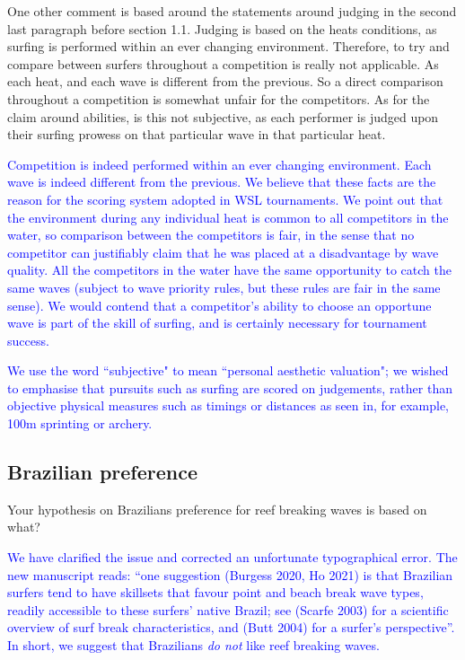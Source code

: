 \documentclass[12pt]{article}
\begin{document}
One other comment is based around the statements around judging in the
second last paragraph before section 1.1. Judging is based on the
heats conditions, as surfing is performed within an ever changing
environment. Therefore, to try and compare between surfers throughout
a competition is really not applicable. As each heat, and each wave is
different from the previous. So a direct comparison throughout a
competition is somewhat unfair for the competitors. As for the claim
around abilities, is this not subjective, as each performer is judged
upon their surfing prowess on that particular wave in that particular
heat.


\textcolor{blue}{Competition is indeed performed within an ever
  changing environment.  Each wave is indeed different from the
  previous.  We believe that these facts are the reason for the
  scoring system adopted in WSL tournaments.  We point out that the
  environment during any individual heat is common to all competitors
  in the water, so comparison between the competitors is fair, in the
  sense that no competitor can justifiably claim that he was placed at
  a disadvantage by wave quality.  All the competitors in the water
  have the same opportunity to catch the same waves (subject to wave
  priority rules, but these rules are fair in the same sense).  We
  would contend that a competitor's ability to choose an opportune
  wave is part of the skill of surfing, and is certainly necessary for
  tournament success.}

\textcolor{blue}{We use the word ``subjective" to mean ``personal
  aesthetic valuation"; we wished to emphasise that pursuits such as
  surfing are scored on judgements, rather than objective physical
  measures such as timings or distances as seen in, for example, 100m
  sprinting or archery.}
  
\subsection*{Brazilian preference}


Your hypothesis on Brazilians preference for reef breaking waves is
based on what?


\textcolor{blue}{We have clarified the issue and corrected an
  unfortunate typographical error.  The new manuscript reads: ``one
  suggestion (Burgess 2020, Ho 2021) is that Brazilian surfers tend to
  have skillsets that favour point and beach break wave types, readily
  accessible to these surfers' native Brazil; see (Scarfe 2003) for a
  scientific overview of surf break characteristics, and (Butt 2004)
  for a surfer's perspective''.  In short, we suggest that Brazilians
  {\em do not} like reef breaking waves.}
\end{document}

